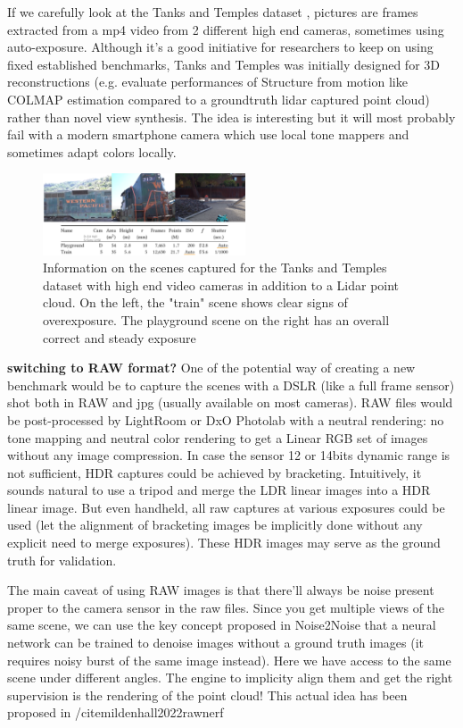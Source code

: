 If we carefully look at the Tanks and Temples dataset \cite{Knapitsch2017TanksAndTemples}, pictures are frames extracted from a mp4 video from 2 different high end cameras, sometimes using auto-exposure. Although it's a good initiative for researchers to keep on using fixed established benchmarks, Tanks and Temples was initially designed for 3D reconstructions (e.g. evaluate performances of Structure from motion like COLMAP estimation compared to a groundtruth lidar captured point cloud) rather than novel view synthesis. The idea is interesting but it will most probably fail with a modern smartphone camera which use local tone mappers and sometimes adapt colors locally.

\label{sec:remplementation}
\begin{figure}[H]
    \centering
    \includegraphics[width=6cm]{figures/tanks_and_temples.png}
    \caption{Information on the scenes captured for the Tanks and Temples dataset with high end video cameras in addition to a Lidar point cloud. On the left, the "train" scene shows clear signs of overexposure. The playground scene on the right has an overall correct and steady exposure}
    \label{fig:tank_and_temples}
\end{figure}


\noindent \textbf{switching to RAW format?} 
One of the potential way of creating a new benchmark would be to capture the scenes with a DSLR (like a full frame sensor) shot both in RAW and jpg (usually available on most cameras). RAW files would be post-processed by LightRoom or DxO Photolab with a neutral rendering: no tone mapping and neutral color rendering to get a Linear RGB set of images without any image compression. In case the sensor 12 or 14bits dynamic range is not sufficient, HDR captures could be achieved by bracketing. Intuitively, it sounds natural to use a tripod and merge the LDR linear images into a HDR linear image. But even handheld, all raw captures at various exposures could be used (let the alignment of bracketing images be implicitly done without any explicit need to merge exposures). These HDR images may serve as the ground truth for validation.

The main caveat of using RAW images is that there'll always be noise present proper to the camera sensor in the raw files. Since you get multiple views of the same scene, we can use the key concept proposed in Noise2Noise \cite{lehtinen2018noise2noise} that a neural network can be trained to denoise images without a ground truth images (it requires noisy burst of the same image instead). Here we have access to the same scene under different angles. The engine to implicity align them and get the right supervision is the rendering of the point cloud! This actual idea has been proposed in /cite{mildenhall2022rawnerf}


